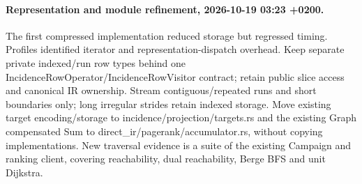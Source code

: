 \documentclass[11pt]{article}
\begin{document}
\paragraph{Representation and module refinement, 2026-10-19 03:23 +0200.}
The first compressed implementation reduced storage but regressed timing. Profiles
identified iterator and representation-dispatch overhead. Keep separate private
indexed/run row types behind one IncidenceRowOperator/IncidenceRowVisitor contract;
retain public slice access and canonical IR ownership. Stream contiguous/repeated
runs and short boundaries only; long irregular strides retain indexed storage.
Move existing target encoding/storage to incidence/projection/targets.rs and the
existing Graph compensated Sum to direct\_ir/pagerank/accumulator.rs, without copying
implementations. New traversal evidence is a suite of the existing Campaign and
ranking client, covering reachability, dual reachability, Berge BFS and unit Dijkstra.
\end{document}
